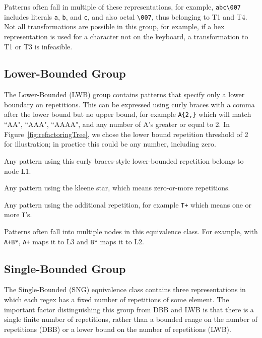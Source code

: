 Patterns often fall in multiple of these representations, for example, \verb!abc\007! includes literals \verb!a!, \verb!b!, and \verb!c!, and also octal \verb!\007!, thus belonging to T1 and T4. 
Not all transformations are possible in this group, for example, if a hex representation is used for a character not on the keyboard, a transformation to T1 or T3 is infeasible.

\subsection{Lower-Bounded Group}
The Lower-Bounded (LWB) group contains patterns that specify only a lower boundary on  repetitions. This can be expressed using curly braces with a comma after the lower bound but no upper bound, for example \verb!A{2,}! which will match ``AA", ``AAA", ``AAAA", and any number of A's greater or equal to 2.  In Figure~\ref{fig:refactoringTree}, we chose the lower bound repetition threshold of  2 for illustration; in practice this could be any number, including zero.


\begin{description}  \itemsep -1pt
\item[L1:] Any pattern using this curly braces-style lower-bounded repetition belongs to node L1.
\item[L2:] Any pattern using the kleene star, which  means zero-or-more repetitions. %
\item[L3:] Any pattern using the additional repetition, for example \verb!T+! which means one or more \verb!T!'s.  
\end{description}

Patterns often fall into multiple nodes in this equivalence class. For example, with \verb!A+B*!,  \verb!A+! maps it to L3 and \verb!B*! maps it to L2. 

\subsection{Single-Bounded Group} 
The Single-Bounded (SNG) equivalence class contains  three representations in which each regex has a fixed number of repetitions of some element. The important factor distinguishing this group from DBB and LWB is that there is a single finite number of repetitions, rather than a bounded range on the number of repetitions (DBB) or a lower bound on the number of repetitions (LWB).


